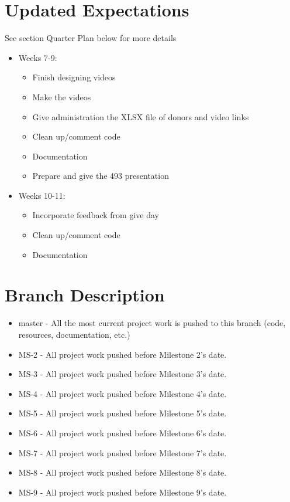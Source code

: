 \documentclass{article}
\begin{document}
\section{Updated Expectations}
See section Quarter Plan below for more details
\begin{itemize}
    \item Weeks 7-9:
    \begin{itemize}
        \item Finish designing videos
        \item Make the videos
        \item Give administration the XLSX file of donors and video links
        \item Clean up/comment code
        \item Documentation
        \item Prepare and give the 493 presentation
    \end{itemize}

    \item Weeks 10-11:
    \begin{itemize}
        \item Incorporate feedback from give day
        \item Clean up/comment code
        \item Documentation
    \end{itemize}
\end{itemize}

\section{Branch Description}
    \begin{itemize}
        \item master - All the most current project work is pushed to this branch (code, resources, documentation, etc.)
        \item MS-2 - All project work pushed before Milestone 2’s date.
        \item MS-3 - All project work pushed before Milestone 3’s date.
        \item MS-4 - All project work pushed before Milestone 4’s date.
        \item MS-5 - All project work pushed before Milestone 5’s date.
        \item MS-6 - All project work pushed before Milestone 6’s date.
        \item MS-7 - All project work pushed before Milestone 7’s date.
        \item MS-8 - All project work pushed before Milestone 8’s date.
        \item MS-9 - All project work pushed before Milestone 9’s date.
    \end{itemize}
    
\end{document}
